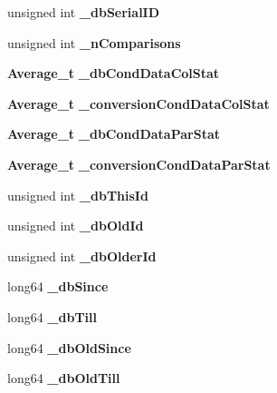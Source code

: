 \begin{DoxyCompactItemize}
\item 
unsigned int {\bfseries \-\_\-db\-Serial\-I\-D}\label{classTestCondDataProcessor_ac51866b83d58c3df68a9aad5cc3f361c}

\item 
unsigned int {\bfseries \-\_\-n\-Comparisons}\label{classTestCondDataProcessor_a99239f4d1dea89a63a6a5aaf9335234f}

\item 
{\bf Average\-\_\-t} {\bfseries \-\_\-db\-Cond\-Data\-Col\-Stat}\label{classTestCondDataProcessor_afd771b2d29220eba7939d808a2bc2649}

\item 
{\bf Average\-\_\-t} {\bfseries \-\_\-conversion\-Cond\-Data\-Col\-Stat}\label{classTestCondDataProcessor_a497455f92c3e9d25c6e5196d524f23fa}

\item 
{\bf Average\-\_\-t} {\bfseries \-\_\-db\-Cond\-Data\-Par\-Stat}\label{classTestCondDataProcessor_ab36e64ae6efd5beda7394b10a4a35cfe}

\item 
{\bf Average\-\_\-t} {\bfseries \-\_\-conversion\-Cond\-Data\-Par\-Stat}\label{classTestCondDataProcessor_a96b2e4b44453e3e665fc85c3f2151085}

\item 
unsigned int {\bfseries \-\_\-db\-This\-Id}\label{classTestCondDataProcessor_a8d19763767c1c22599790ada414cae0f}

\item 
unsigned int {\bfseries \-\_\-db\-Old\-Id}\label{classTestCondDataProcessor_abb286759ea8799f0ac1297689869c185}

\item 
unsigned int {\bfseries \-\_\-db\-Older\-Id}\label{classTestCondDataProcessor_a99017f95cb539604e69267c9e6d825ac}

\item 
long64 {\bfseries \-\_\-db\-Since}\label{classTestCondDataProcessor_ad05bec5578a01fc52ad4ce3d84f3aade}

\item 
long64 {\bfseries \-\_\-db\-Till}\label{classTestCondDataProcessor_a344dc9a4fc25a9c9bcae9fd9c38cb067}

\item 
long64 {\bfseries \-\_\-db\-Old\-Since}\label{classTestCondDataProcessor_ad233d7eadb8628d8630e7e472dd54e0d}

\item 
long64 {\bfseries \-\_\-db\-Old\-Till}\label{classTestCondDataProcessor_a289234a58bddccd87f6468259c1d4c11}


\end{DoxyCompactItemize}

